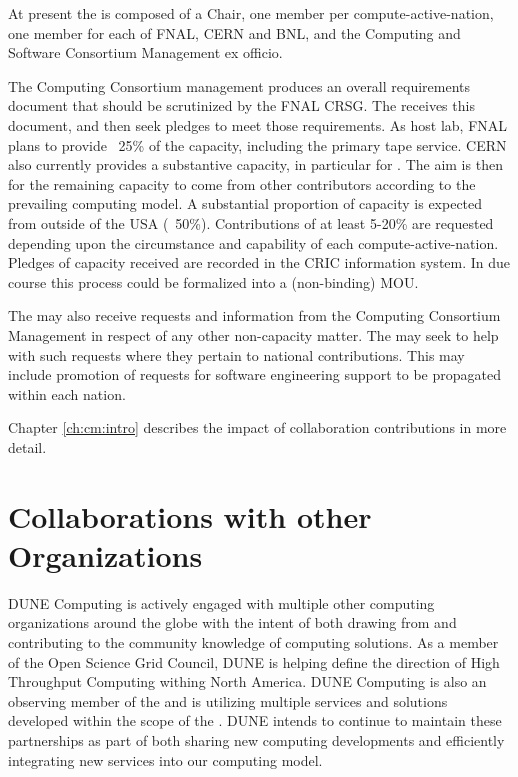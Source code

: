 \documentclass[../main-v1.tex]{subfiles}
\begin{document}
At present the  is composed of a Chair, one member per compute-active-nation, one member for each of FNAL, CERN and BNL, and the Computing and Software Consortium  Management ex officio.

The Computing Consortium management produces an overall requirements document that should be scrutinized by the FNAL CRSG. The  receives this document, and then seek pledges to meet those requirements. As host lab, FNAL plans to provide ~25\% of the capacity, including the primary tape service.
CERN also currently provides a substantive capacity, in particular for .
The aim is then for the remaining capacity to come from other contributors according to the prevailing computing model. A substantial proportion of capacity is expected from outside of the USA  (~50\%). Contributions of at least 5-20\% are requested depending upon the circumstance and capability of each compute-active-nation.
Pledges of capacity received are recorded in the CRIC information system. In due course this process could be formalized into a (non-binding) MOU.

The  may also receive requests and information from the Computing Consortium Management in respect of any other non-capacity matter. The  may seek to help with such requests where they pertain to national contributions. This may include promotion of requests for software engineering support to be propagated within each nation.  

Chapter \ref{ch:cm:intro} describes the impact of  collaboration contributions in more detail. 

\section{Collaborations with other Organizations}

DUNE Computing is actively engaged with multiple other computing organizations around the globe with the intent of both drawing from and contributing to the community knowledge of computing solutions. As a member of the Open Science Grid Council, DUNE is helping define the direction of High Throughput Computing withing North America. DUNE Computing is also an observing member of the  and is utilizing multiple services and solutions developed within the scope of the . DUNE intends to continue to maintain these partnerships as part of both sharing new computing developments and efficiently integrating new services into our computing model.
\end{document}
